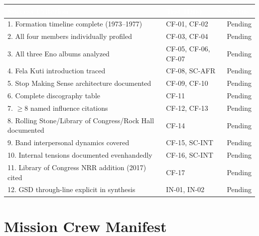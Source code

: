 \documentclass[11pt,letterpaper]{article}
\newcommand{\tableheader}[1]{\textbf{\sffamily\textcolor{white}{#1}}}
\begin{document}
\begin{center}
\begin{tabularx}{\textwidth}{XL{3.5cm}C{1.5cm}}
\toprule
{}
\tableheader{Success Criterion} & \tableheader{Test ID(s)} & \tableheader{Status} \\
. Formation timeline complete (1973--1977) & CF-01, CF-02 & Pending \\
2. All four members individually profiled & CF-03, CF-04 & Pending \\
3. All three Eno albums analyzed & CF-05, CF-06, CF-07 & Pending \\
4. Fela Kuti introduction traced & CF-08, SC-AFR & Pending \\
5. Stop Making Sense architecture documented & CF-09, CF-10 & Pending \\
6. Complete discography table & CF-11 & Pending \\
7. $\ge$8 named influence citations & CF-12, CF-13 & Pending \\
8. Rolling Stone/Library of Congress/Rock Hall documented & CF-14 & Pending \\
9. Band interpersonal dynamics covered & CF-15, SC-INT & Pending \\
10. Internal tensions documented evenhandedly & CF-16, SC-INT & Pending \\
11. Library of Congress NRR addition (2017) cited & CF-17 & Pending \\
12. GSD through-line explicit in synthesis & IN-01, IN-02 & Pending \\
\bottomrule
\end{tabularx}
\end{center}

\section{Mission Crew Manifest}
\end{document}
